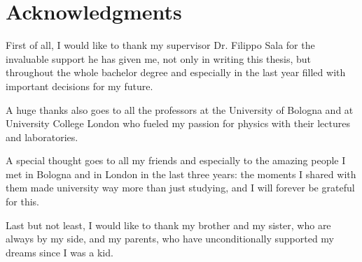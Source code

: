 \chapter*{Acknowledgments}

First of all, I would like to thank my supervisor Dr. Filippo Sala for the invaluable support he has given me, not only in writing this thesis, but throughout the whole bachelor degree and especially in the last year filled with important decisions for my future.

A huge thanks also goes to all the professors at the University of Bologna and at University College London who fueled my passion for physics with their lectures and laboratories.

A special thought goes to all my friends and especially to the amazing people I met in Bologna and in London in the last three years: the moments I shared with them made university way more than just studying, and I will forever be grateful for this.

Last but not least, I would like to thank my brother and my sister, who are always by my side, and my parents, who have unconditionally supported my dreams since I was a kid.